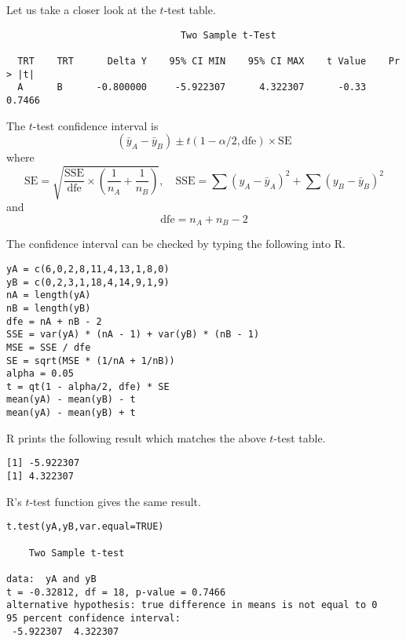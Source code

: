 \documentclass[12pt]{article}
\begin{document}
Let us take a closer look at the $t$-test table.

{\footnotesize\begin{verbatim}
                               Two Sample t-Test

  TRT    TRT      Delta Y    95% CI MIN    95% CI MAX    t Value    Pr > |t|  
  A      B      -0.800000     -5.922307      4.322307      -0.33      0.7466  
\end{verbatim}}

The $t$-test confidence interval is
\begin{equation*}
(\bar y_A-\bar y_B)\pm t(1-\alpha/2,\text{dfe})\times\text{SE}
\end{equation*}
where
\begin{equation*}
\text{SE}=\sqrt{\frac{\text{SSE}}{\text{dfe}}\times\left(\frac{1}{n_A}+\frac{1}{n_B}\right)},
\quad
\text{SSE}=\sum(y_A-\bar y_A)^2+\sum(y_B-\bar y_B)^2
\end{equation*}
and
\begin{equation*}
\text{dfe}=n_A+n_B-2
\end{equation*}

The confidence interval can be checked by typing the following into R.

{\footnotesize\begin{verbatim}
yA = c(6,0,2,8,11,4,13,1,8,0)
yB = c(0,2,3,1,18,4,14,9,1,9)
nA = length(yA)
nB = length(yB)
dfe = nA + nB - 2
SSE = var(yA) * (nA - 1) + var(yB) * (nB - 1)
MSE = SSE / dfe
SE = sqrt(MSE * (1/nA + 1/nB))
alpha = 0.05
t = qt(1 - alpha/2, dfe) * SE
mean(yA) - mean(yB) - t
mean(yA) - mean(yB) + t
\end{verbatim}}

R prints the following result which matches the above $t$-test table.

{\footnotesize\begin{verbatim}
[1] -5.922307
[1] 4.322307
\end{verbatim}}

R's $t$-test function gives the same result.

{\footnotesize\begin{verbatim}
t.test(yA,yB,var.equal=TRUE)

	Two Sample t-test

data:  yA and yB
t = -0.32812, df = 18, p-value = 0.7466
alternative hypothesis: true difference in means is not equal to 0
95 percent confidence interval:
 -5.922307  4.322307
\end{verbatim}}
\end{document}
